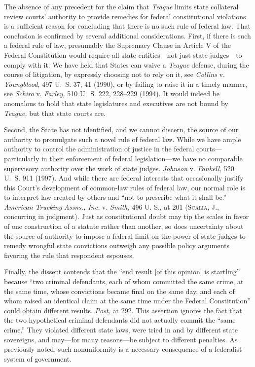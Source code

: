 {{{{  The absence of any precedent for the claim that \emph{Teague} limits
state collateral review courts' authority to provide remedies for
federal constitutional violations is a sufficient reason for concluding
that there is no such rule of federal law. That conclusion is confirmed
by several additional considerations. First, if there is such a federal
rule of law, presumably the Supremacy Clause in Article V of the
Federal Constitution would require all state entities---not just
state judges---to comply with it. We have held that States can waive
a \emph{Teague} defense, during the course of litigation, by expressly
choosing not to rely on it, see \emph{Collins} v. \emph{Youngblood,} 497
U.~S. 37, 41 (1990), or by failing to raise it in a timely manner,
see \emph{Schiro} v. \emph{Farley,} 510 U.~S. 222, 228--229 (1994). It
would indeed be anomalous to hold that state legislatures and executives
are not bound by \emph{Teague,} but that state courts are.

  Second, the State has not identified, and we cannot discern, the
source of our authority to promulgate such a novel rule of federal
law. While we have ample authority to control the administration of
justice in the federal courts---particularly in their enforcement of
federal legislation---we have no comparable supervisory authority over
the work of state judges. \emph{Johnson} v. \emph{Fankell,} 520 U.~S.
911 (1997). And while there are federal interests that occasionally
justify this \newpage  Court's development of common-law rules of
federal law, our normal role is to interpret law created by others
and ``not to prescribe what it shall be.'' \emph{American Trucking}
\emph{Assns., Inc.} v. \emph{Smith,} 496 U. S., at 201 (\textsc{Scalia,} J.,
concurring in judgment). Just as constitutional doubt may tip the
scales in favor of one construction of a statute rather than another,
so does uncertainty about the source of authority to impose a federal
limit on the power of state judges to remedy wrongful state convictions
outweigh any possible policy arguments favoring the rule that respondent
espouses.

  Finally, the dissent contends that the ``end result [of this opinion]
is startling'' because ``two criminal defendants, each of whom
committed the same crime, at the same time, whose convictions became
final on the same day, and each of whom raised an identical claim at
the same time under the Federal Constitution'' could obtain different
results. \emph{Post,} at 292. This assertion ignores the fact that
the two hypothetical criminal defendants did not actually commit the
``same crime.'' They violated different state laws, were tried in and
by different state sovereigns, and may---for many reasons---be subject
to different penalties. As previously noted, such nonuniformity is a
necessary consequence of a federalist system of government.

}}}}
